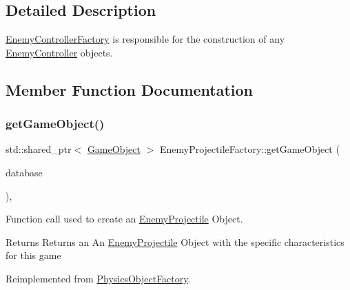 \subsection{Detailed Description}
\hyperlink{class_enemy_controller_factory}{Enemy\+Controller\+Factory} is responsible for the construction of any \hyperlink{class_enemy_controller}{Enemy\+Controller} objects. 

\subsection{Member Function Documentation}
\mbox{\label{class_enemy_projectile_factory_a081c6bea7032956c278fdf4ff62d530a}} 
\subsubsection{\texorpdfstring{get\+Game\+Object()}{getGameObject()}}
{\footnotesize\ttfamily std\+::shared\+\_\+ptr$<$ \hyperlink{class_game_object}{Game\+Object} $>$ Enemy\+Projectile\+Factory\+::get\+Game\+Object (\begin{DoxyParamCaption}\item[{const std\+::shared\+\_\+ptr$<$ \hyperlink{class_database_interface}{Database\+Interface} $>$ \&}]{database }\end{DoxyParamCaption})\hspace{0.3cm}{\ttfamily [override]}, {\ttfamily [virtual]}}



Function call used to create an \hyperlink{class_enemy_projectile}{Enemy\+Projectile} Object. 

\begin{DoxyReturn}{Returns}
Returns an An \hyperlink{class_enemy_projectile}{Enemy\+Projectile} Object with the specific characteristics for this game 
\end{DoxyReturn}


Reimplemented from \hyperlink{class_physics_object_factory_a2644107d0c455c3307559cd824a7c9a8}{Physics\+Object\+Factory}.

\mbox{\label{class_enemy_projectile_factory_a1ef660e5962f29b7353054c6480477c7}} 
